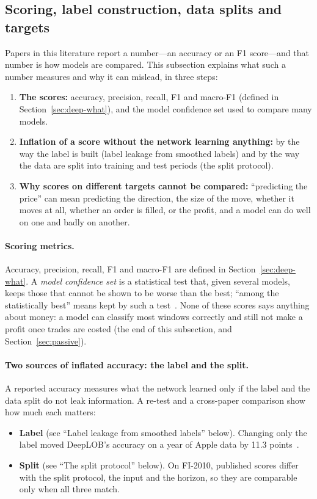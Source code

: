 \subsection{Scoring, label construction, data splits and targets}
\label{sec:deep-real}

Papers in this literature report a number---an accuracy or an F1 score---and that number is how models are
compared. This subsection explains what such a number measures and why it can mislead, in three steps:
\begin{enumerate}[leftmargin=1.8em,itemsep=1pt]
\item \textbf{The scores:} accuracy, precision, recall, F1 and macro-F1 (defined in Section~\ref{sec:deep-what}),
  and the model confidence set used to compare many models.
\item \textbf{Inflation of a score without the network learning anything:} by the way the label is built
  (label leakage from smoothed labels) and by the way the data are split into training and test periods (the
  split protocol).
\item \textbf{Why scores on different targets cannot be compared:} ``predicting the price'' can mean predicting the
  direction, the size of the move, whether it moves at all, whether an order is filled, or the profit, and a model
  can do well on one and badly on another.
\end{enumerate}

\paragraph{Scoring metrics.} Accuracy, precision, recall, F1 and macro-F1 are defined in
Section~\ref{sec:deep-what}. A \emph{model confidence set} is a statistical test that, given several models, keeps those that cannot be shown to
be worse than the best; ``among the statistically best'' means kept by such a test~\citep{hansen2011mcs}. None of
these scores says anything about money: a model can classify most windows correctly and still not make a profit
once trades are costed (the end of this subsection, and Section~\ref{sec:passive}).

\paragraph{Two sources of inflated accuracy: the label and the split.} A reported accuracy measures what the
network learned only if the label and the data split do not leak information. A re-test and a cross-paper
comparison show how much each matters:
\begin{itemize}[leftmargin=1.5em,itemsep=1pt]
\item \textbf{Label} (see ``Label leakage from smoothed labels'' below). Changing only the label moved DeepLOB's accuracy on a year
  of Apple data by 11.3 points~\citep{lee2024predictability}.
\item \textbf{Split} (see ``The split protocol'' below). On FI-2010, published scores differ with the split protocol, the
  input and the horizon, so they are comparable only when all three match.
\end{itemize}

